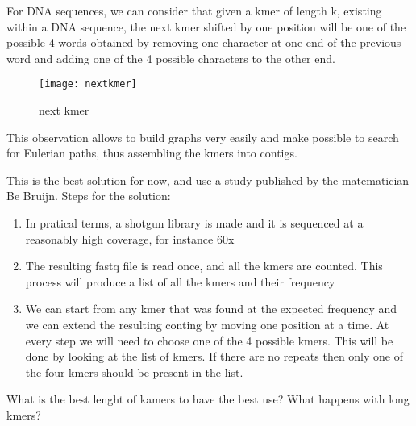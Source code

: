 For DNA sequences, we can consider that given a kmer of length k,
existing within a DNA sequence, the next kmer shifted by one position will be
one of the possible 4 words obtained by removing one character at one end of
the previous word and adding one of the 4 possible characters to the other end.

\begin{figure}[H]
  \centering
  \texttt{[image: nextkmer]}
  \caption{next kmer}
  \label{fig:nextkmer}
\end{figure}

This observation allows to build graphs very easily and make possible to search
for Eulerian paths, thus assembling the kmers into contigs.

This is the best solution for now, and use a study published by the
matematician Be Bruijn.
Steps for the solution:
\begin{enumerate}
  \item In pratical terms, a shotgun library is made and it is sequenced at a
reasonably high coverage, for instance 60x
  \item The resulting fastq file is read once, and all the kmers are counted.
This process will produce a list of all the kmers and their frequency
  \item We can start from any kmer that was found at the expected frequency and
we can extend the resulting conting by moving one position at a time. At every
step we will need to choose one of the 4 possible kmers. This will be done by
looking at the list of kmers. If there are no repeats then only one of the four
kmers should be present in the list.
\end{enumerate}

What is the best lenght of kamers to have the best use? What happens with long
kmers?
